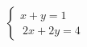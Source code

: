 \documentclass[preview]{standalone}
\begin{document}
\begin{align*}
\left\{ \begin{array}{cl} x + y = 1 \\[1pt] \ 2x + 2y = 4 \end{array} \right.
\end{align*}
\end{document}
